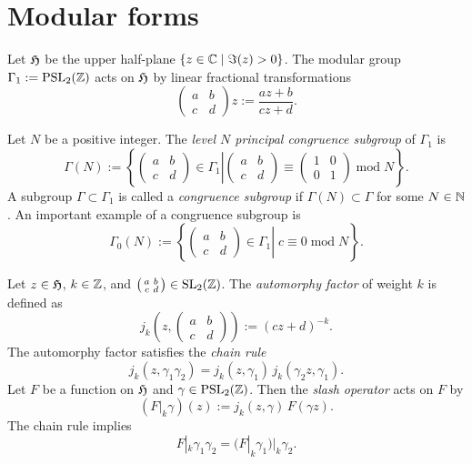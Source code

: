 \section{Modular forms}
Let $\mathfrak{H}$ be the upper half-plane $\{z\in\mathbb{C}\mid\Im(z)>0\}$. The modular group $\Gamma_1:=\mathrm{PSL}_2(\mathbb{Z})$ acts on $\mathfrak{H}$ by linear fractional transformations
$$\left(\begin{smallmatrix}a&b\\c&d\end{smallmatrix}\right)z:=\frac{az+b}{cz+d}.$$

Let $N$ be a positive integer. The \emph{level $N$ principal congruence subgroup} of $\Gamma_1$ is
$$\Gamma(N):=\left\{\left.\left(\begin{smallmatrix}a&b\\c&d\end{smallmatrix}\right)\in\Gamma_1\right|\left(\begin{smallmatrix}a&b\\c&d\end{smallmatrix}\right)\equiv\left(\begin{smallmatrix}1&0\\0&1\end{smallmatrix}\right)\;\mathrm{mod}\;N\right\}.$$
A subgroup $\Gamma\subset\Gamma_1$ is called a \emph{congruence subgroup} if $\Gamma(N)\subset\Gamma$ for some $N\in\mathbb{N}$. An important example of a congruence subgroup is
$$\Gamma_0(N):=\left\{\left.\left(\begin{smallmatrix}a&b\\c&d\end{smallmatrix}\right)\in\Gamma_1\right|\;c\equiv0\;\mathrm{mod}\;N\right\}.$$

Let $z\in\mathfrak{H}$, $k\in\mathbb{Z}$, and $\left(\begin{smallmatrix}a&b\\c&d\end{smallmatrix}\right)\in\mathrm{SL}_2(\mathbb{Z})$. The \emph{automorphy factor} of weight $k$ is defined as
$$j_k(z,\left(\begin{smallmatrix}a&b\\c&d\end{smallmatrix}\right)):=(cz+d)^{-k}.$$
The automorphy factor satisfies the \emph{chain rule}
$$j_k(z,\gamma_1\gamma_2)=j_k(z,\gamma_1)\,j_k(\gamma_2z,\gamma_1). $$
Let $F$ be a  function on $\mathfrak{H}$ and $\gamma\in\mathrm{PSL}_2(\mathbb{Z})$. Then the \emph{slash operator} acts on $F$ by
$$(F|_k\gamma)(z):=j_k(z,\gamma)\,F(\gamma z). $$
The chain rule implies
$$F|_k\gamma_1\gamma_2=(F|_k\gamma_1)|_k\gamma_2.$$

